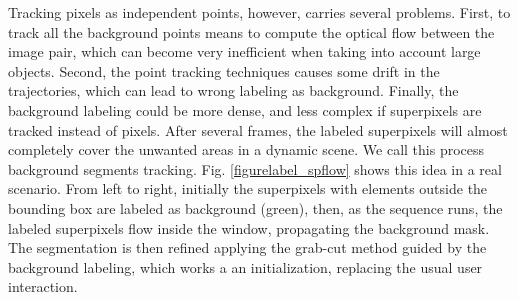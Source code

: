 
Tracking pixels as independent points, however, carries several problems. First, to track all the background points means to compute the optical flow between the image pair, which can become very inefficient 
when taking into account large objects. Second, the point tracking techniques causes some drift in the trajectories, which can lead to wrong labeling as background. Finally, the background labeling could be 
more dense, and less complex if superpixels are tracked instead of pixels.  After several frames, 
the labeled superpixels will almost completely cover the unwanted areas in a dynamic scene. We call this process background segments tracking.  Fig. \ref{figurelabel_spflow} shows this idea in a real scenario. From left to right, initially the superpixels with elements outside the bounding box are labeled as background (green), then, as the sequence runs, the labeled superpixels flow inside the window, propagating the background mask. 
The segmentation is then refined  applying the grab-cut method \cite{c14,c18} guided by the background labeling, which works a an initialization, replacing the usual user interaction.


